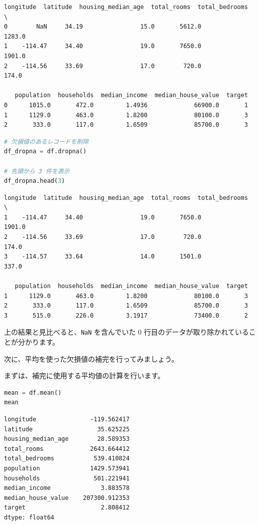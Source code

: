 \begin{lstlisting}[style=outputcell]
   longitude  latitude  housing_median_age  total_rooms  total_bedrooms  \
0        NaN     34.19                15.0       5612.0          1283.0   
1    -114.47     34.40                19.0       7650.0          1901.0   
2    -114.56     33.69                17.0        720.0           174.0   

   population  households  median_income  median_house_value  target  
0      1015.0       472.0         1.4936             66900.0       1  
1      1129.0       463.0         1.8200             80100.0       3  
2       333.0       117.0         1.6509             85700.0       3  
\end{lstlisting}

\begin{lstlisting}[style=codecell,language=Python]
# 欠損値のあるレコードを削除
df_dropna = df.dropna()

# 先頭から 3 件を表示
df_dropna.head(3)
\end{lstlisting}

\begin{lstlisting}[style=outputcell]
   longitude  latitude  housing_median_age  total_rooms  total_bedrooms  \
1    -114.47     34.40                19.0       7650.0          1901.0   
2    -114.56     33.69                17.0        720.0           174.0   
3    -114.57     33.64                14.0       1501.0           337.0   

   population  households  median_income  median_house_value  target  
1      1129.0       463.0         1.8200             80100.0       3  
2       333.0       117.0         1.6509             85700.0       3  
3       515.0       226.0         3.1917             73400.0       2  
\end{lstlisting}

上の結果と見比べると、\texttt{NaN} を含んでいた 0 行目のデータが取り除かれていることが分かります。


次に、平均を使った欠損値の補完を行ってみましょう。

まずは、補完に使用する平均値の計算を行います。


\begin{lstlisting}[style=codecell,language=Python]
mean = df.mean()
mean
\end{lstlisting}

\begin{lstlisting}[style=outputcell]
longitude               -119.562417
latitude                  35.625225
housing_median_age        28.589353
total_rooms             2643.664412
total_bedrooms           539.410824
population              1429.573941
households               501.221941
median_income              3.883578
median_house_value    207300.912353
target                     2.808412
dtype: float64
\end{lstlisting}

